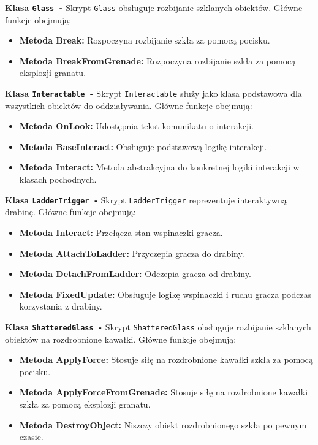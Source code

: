\textbf{Klasa \texttt{Glass -}}
Skrypt \texttt{Glass} obsługuje rozbijanie szklanych obiektów. Główne funkcje obejmują:
\begin{itemize}
  \item \textbf{Metoda Break:} Rozpoczyna rozbijanie szkła za pomocą pocisku.
  \item \textbf{Metoda BreakFromGrenade:} Rozpoczyna rozbijanie szkła za pomocą eksplozji granatu.
\end{itemize}

\textbf{Klasa \texttt{Interactable -}}
Skrypt \texttt{Interactable} służy jako klasa podstawowa dla wszystkich obiektów do oddziaływania. Główne funkcje obejmują:
\begin{itemize}
  \item \textbf{Metoda OnLook:} Udostępnia tekst komunikatu o interakcji.
  \item \textbf{Metoda BaseInteract:} Obsługuje podstawową logikę interakcji.
  \item \textbf{Metoda Interact:} Metoda abstrakcyjna do konkretnej logiki interakcji w klasach pochodnych.
\end{itemize}

\textbf{Klasa \texttt{LadderTrigger -}}
Skrypt \texttt{LadderTrigger} reprezentuje interaktywną drabinę. Główne funkcje obejmują:
\begin{itemize}
  \item \textbf{Metoda Interact:} Przełącza stan wspinaczki gracza.
  \item \textbf{Metoda AttachToLadder:} Przyczepia gracza do drabiny.
  \item \textbf{Metoda DetachFromLadder:} Odczepia gracza od drabiny.
  \item \textbf{Metoda FixedUpdate:} Obsługuje logikę wspinaczki i ruchu gracza podczas korzystania z drabiny.
\end{itemize}

\textbf{Klasa \texttt{ShatteredGlass -}}
Skrypt \texttt{ShatteredGlass} obsługuje rozbijanie szklanych obiektów na rozdrobnione kawałki. Główne funkcje obejmują:
\begin{itemize}
  \item \textbf{Metoda ApplyForce:} Stosuje siłę na rozdrobnione kawałki szkła za pomocą pocisku.
  \item \textbf{Metoda ApplyForceFromGrenade:} Stosuje siłę na rozdrobnione kawałki szkła za pomocą eksplozji granatu.
  \item \textbf{Metoda DestroyObject:} Niszczy obiekt rozdrobnionego szkła po pewnym czasie.
\end{itemize}

